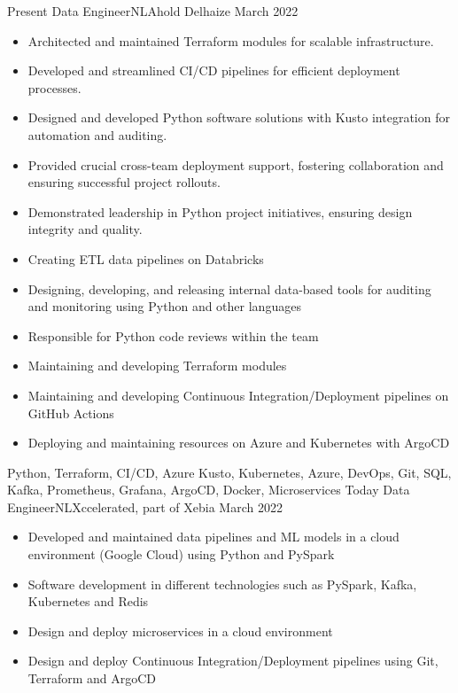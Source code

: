 \begin{experiences}
  \experience
  {Present}   {Data Engineer}{NL}{Ahold Delhaize}
  {March 2022} {
    \begin{itemize}
      \item Architected and maintained Terraform modules for scalable infrastructure.
      \item Developed and streamlined CI/CD pipelines for efficient deployment processes.
      \item Designed and developed Python software solutions with Kusto integration for automation and auditing.
      \item Provided crucial cross-team deployment support, fostering collaboration and ensuring successful project rollouts.
      \item Demonstrated leadership in Python project initiatives, ensuring design integrity and quality.
      \item Creating ETL data pipelines on Databricks
      \item Designing, developing, and releasing internal data-based tools for auditing and monitoring using Python and other languages
      \item Responsible for Python code reviews within the team
      \item Maintaining and developing Terraform modules
      \item Maintaining and developing Continuous Integration/Deployment pipelines on GitHub Actions
      \item Deploying and maintaining resources on Azure and Kubernetes with ArgoCD
    \end{itemize}
  }
  {Python, Terraform, CI/CD, Azure Kusto, Kubernetes, Azure, DevOps, Git, SQL, Kafka, Prometheus, Grafana, ArgoCD, Docker, Microservices}
  \emptySeparator
  \experience
  {Today}   {Data Engineer}{NL}{Xccelerated, part of Xebia}
  {March 2022} {
    \begin{itemize}
      \item Developed and maintained data pipelines and ML models in a cloud environment (Google Cloud) using Python and PySpark
      \item Software development in different technologies such as PySpark, Kafka, Kubernetes and Redis
      \item Design and deploy microservices in a cloud environment
      \item Design and deploy Continuous Integration/Deployment pipelines using Git, Terraform and ArgoCD

\end{itemize}}
\end{experiences}
